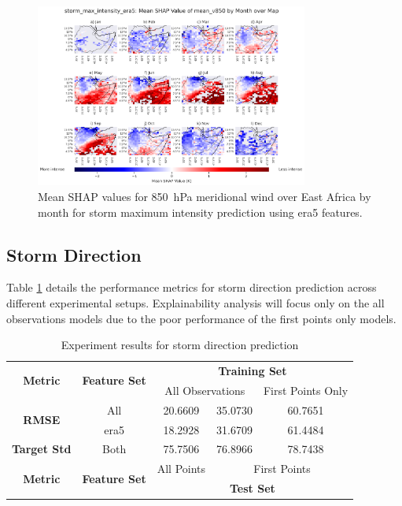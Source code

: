 \begin{figure}[ht]
    \centering
    \includegraphics[width=0.8\textwidth]{../figures/generated/experiments/storm_max_intensity/geographic_corr/storm_max_intensity_era5_shap_mean_v850_map_by_month.png}
    \caption{Mean SHAP values for \SI{850}{\hecto\pascal} meridional wind over East Africa by month for storm maximum intensity prediction using \acrshort{era5} features.}
    \label{fig:storm_max_intensity_era5_shap_mean_v850_map_by_month}
\end{figure}

\clearpage
\subsection{Storm Direction}

Table \ref{tab:storm_direction_results} details the performance metrics for storm direction prediction across different experimental setups. Explainability analysis will focus only on the all observations models due to the poor performance of the first points only models.

\begin{table}[ht]
\centering
\caption{Experiment results for storm direction prediction}
\label{tab:storm_direction_results}
\begin{tabular}{|c|c|c|c|c|}
\hline
\multirow{2}{*}{\textbf{Metric}} & \multirow{2}{*}{\textbf{Feature Set}} & \multicolumn{3}{c|}{\textbf{Training Set} } \\ \cline{3-5}
 & & \multicolumn{2}{c|}{All Observations} & First Points Only \\
\hline \hline
\multirow{2}{*}{\textbf{RMSE}} & All & 20.6609 & 35.0730 & 60.7651 \\
 & \acrshort{era5} & 18.2928 & 31.6709 & 61.4484 \\
\hline
\textbf{Target Std} & Both & 75.7506 & 76.8966 & 78.7438 \\
\hline \hline
\multirow{2}{*}{\textbf{Metric}} & \multirow{2}{*}{\textbf{Feature Set}} & All Points & \multicolumn{2}{c|}{First Points} \\ \cline{3-5}
 & & \multicolumn{3}{c|}{\textbf{Test Set}} \\ 
\hline
\end{tabular}
\end{table}

